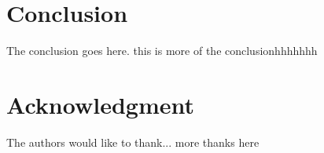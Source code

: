 \documentclass[10pt, conference, compsocconf]{IEEEtran}
\begin{document}
%





\section{Conclusion}
The conclusion goes here. this is more of the conclusionhhhhhhh



\section*{Acknowledgment}


The authors would like to thank...
more thanks here


\end{document}
